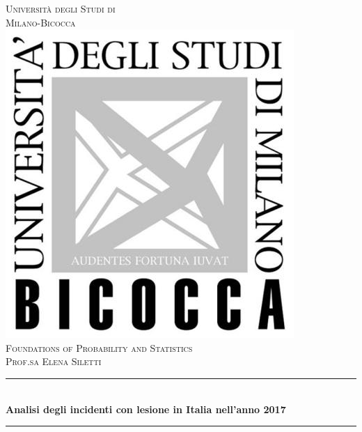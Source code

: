 \documentclass[12pt]{article}
\begin{document}
\begin{titlepage}

\newcommand{\HRule}{\rule{\linewidth}{0.5mm}} %

\center %
 

\textsc{\LARGE Università degli Studi di\\ \smallskip Milano-Bicocca}\\[1.5cm] %
\includegraphics[scale=1]{logo.jpg}\\[1cm] %
\textsc{\Large Foundations of Probability and Statistics}\\[0.5cm] %
\textsc{\large Prof.sa Elena Siletti}\\[0.5cm] %

 \vspace{0.8cm}
\HRule \\[0.4cm]
{ \Huge \bfseries Analisi degli incidenti con lesione in Italia nell’anno 2017}\\[0.4cm] %
\HRule \\[2.9cm]


\end{titlepage}
\end{document}
